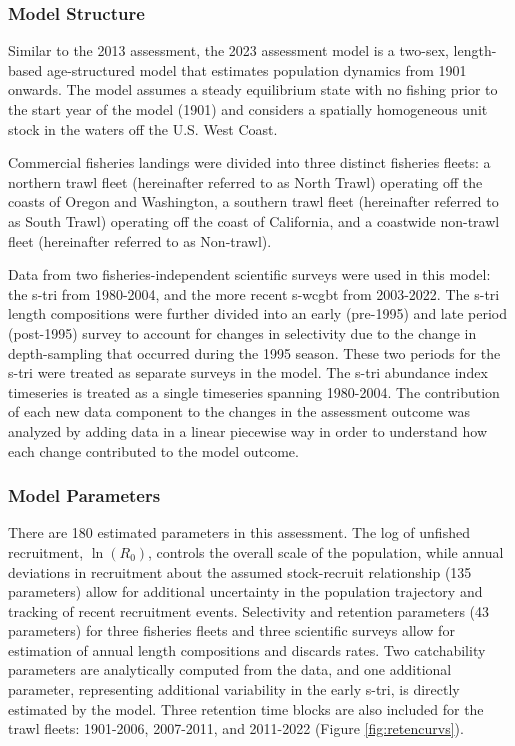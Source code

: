 \documentclass[11pt,
  english,
  letterpaper,
]{article}
\begin{document}
\hypertarget{model-structure}{%
\subsubsection{Model Structure}\label{model-structure}}

Similar to the 2013 assessment, the 2023 assessment model is a two-sex, length-based age-structured model that estimates population dynamics from 1901 onwards. The model assumes a steady equilibrium state with no fishing prior to the start year of the model (1901) and considers a spatially homogeneous unit stock in the waters off the U.S. West Coast.

Commercial fisheries landings were divided into three distinct fisheries fleets: a northern trawl fleet (hereinafter referred to as North Trawl) operating off the coasts of Oregon and Washington, a southern trawl fleet (hereinafter referred to as South Trawl) operating off the coast of California, and a coastwide non-trawl fleet (hereinafter referred to as Non-trawl).

Data from two fisheries-independent scientific surveys were used in this model: the \gls{s-tri} from 1980-2004, and the more recent \gls{s-wcgbt} from 2003-2022. The \gls{s-tri} length compositions were further divided into an early (pre-1995) and late period (post-1995) survey to account for changes in selectivity due to the change in depth-sampling that occurred during the 1995 season. These two periods for the \gls{s-tri} were treated as separate surveys in the model. The \gls{s-tri} abundance index timeseries is treated as a single timeseries spanning 1980-2004. The contribution of each new data component to the changes in the assessment outcome was analyzed by adding data in a linear piecewise way in order to understand how each change contributed to the model outcome.

\hypertarget{model-parameters}{%
\subsubsection{Model Parameters}\label{model-parameters}}

There are 180 estimated parameters in this assessment. The log of unfished recruitment, \(\ln(R_0)\), controls the overall scale of the population, while annual deviations in recruitment about the assumed stock-recruit relationship (135 parameters) allow for additional uncertainty in the population trajectory and tracking of recent recruitment events. Selectivity and retention parameters (43 parameters) for three fisheries fleets and three scientific surveys allow for estimation of annual length compositions and discards rates. Two catchability parameters are analytically computed from the data, and one additional parameter, representing additional variability in the early \gls{s-tri}, is directly estimated by the model. Three retention time blocks are also included for the trawl fleets: 1901-2006, 2007-2011, and 2011-2022 (Figure \ref{fig:retencurvs}).
\end{document}
